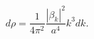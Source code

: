 \begin{equation}\label{eq:drho}
  d\rho=\frac{1}{4\pi^2}\frac{|\beta_k|^2}{a^4}k^3 dk.
\end{equation}

